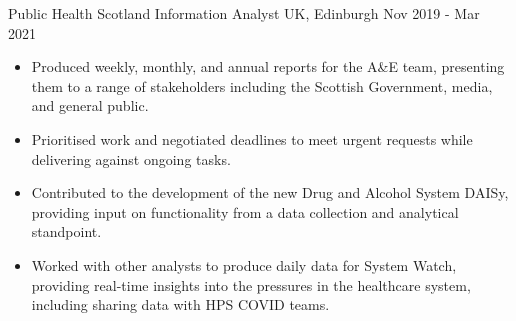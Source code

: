  \cventry
{Public Health Scotland} %
{Information Analyst} %
{UK, Edinburgh} %
{Nov 2019 - Mar 2021} %
{
\begin{itemize}
    \item Produced weekly, monthly, and annual reports for the A\&E team, presenting them to a range of stakeholders including the Scottish Government, media, and general public.
    \item Prioritised work and negotiated deadlines to meet urgent requests while delivering against ongoing tasks.
    \item Contributed to the development of the new Drug and Alcohol System DAISy, providing input on functionality from a data collection and analytical standpoint.
    \item Worked with other analysts to produce daily data for System Watch, providing real-time insights into the pressures in the healthcare system, including sharing data with HPS COVID teams. 
\end{itemize}
}
